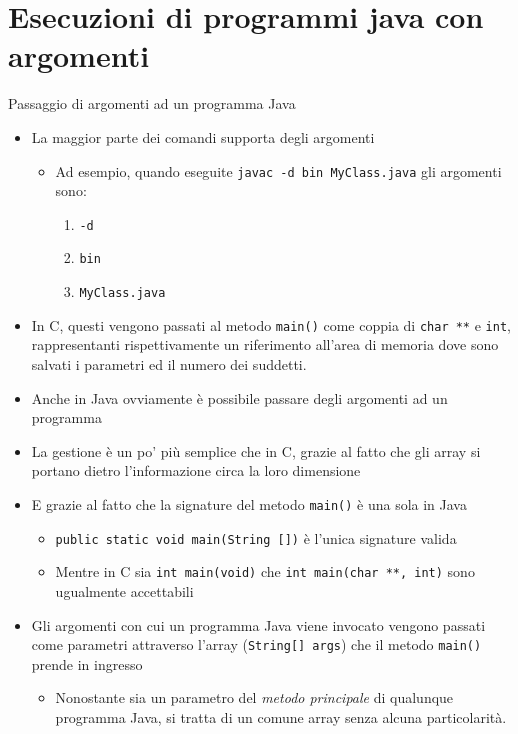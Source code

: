 \documentclass[xcolor=dvipsnames,presentation]{beamer}
\begin{document}
\section{Esecuzioni di programmi java con argomenti}

\begin{frame}[allowframebreaks]{Passaggio di argomenti ad un programma Java}
    \begin{itemize}\itemsep10pt
        \item La maggior parte dei comandi supporta degli argomenti
        \begin{itemize}
            \item Ad esempio, quando eseguite \texttt{javac -d bin MyClass.java} gli argomenti sono:
            \begin{enumerate}
             \item \texttt{-d}
             \item \texttt{bin}
             \item \texttt{MyClass.java}
            \end{enumerate}
        \end{itemize}
        \item In C, questi vengono passati al metodo \texttt{main()} come coppia di \texttt{char **} e \texttt{int}, rappresentanti rispettivamente un riferimento all'area di memoria dove sono salvati i parametri ed il numero dei suddetti.
        \item Anche in Java ovviamente è possibile passare degli argomenti ad un programma
        \end{itemize}

\framebreak

    \begin{itemize}\itemsep10pt
    \item La gestione è un po' più semplice che in C, grazie al fatto che gli array si portano dietro l'informazione circa la loro dimensione
        \item E grazie al fatto che la signature del metodo \texttt{main()} è una sola in Java
        \begin{itemize}
            \item \texttt{public static void main(String [])} è l'unica signature valida
            \item Mentre in C sia \texttt{int main(void)} che \texttt{int main(char **, int)} sono ugualmente accettabili
        \end{itemize}


        \item Gli argomenti con cui un programma Java viene invocato vengono passati come parametri attraverso l'array (\texttt{String[] args}) che il metodo \texttt{main()} prende in ingresso
        \begin{itemize}
        \item Nonostante sia un parametro del \emph{metodo principale} di qualunque programma Java, si tratta di un comune array senza alcuna particolarità.
        \end{itemize}

    \end{itemize}
\end{frame}
\end{document}
